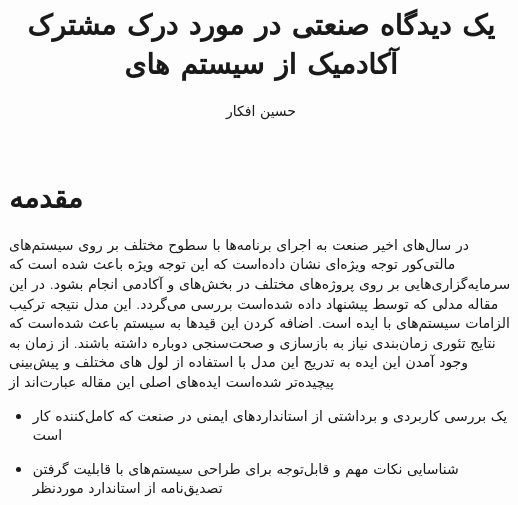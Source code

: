 \documentclass[a4paper, 12pt]{article}
\title{یک دیدگاه صنعتی در مورد درک مشترک آکادمیک از سیستم های \lr{mixed-criticality}}
\author{حسین افکار}
\begin{document}
\maketitle

\section{مقدمه}
در سال‌های اخیر صنعت به اجرای برنامه‌ها با سطوح
مختلف بر روی سیستم‌های مالتی‌کور توجه ویژه‌ای نشان داده‌است که این توجه ویژه باعث
شده است که سرمایه‌گزاری‌هایی بر روی پروژه‌های مختلف در بخش‌های
و
آکادمی انجام بشود.
در این مقاله مدلی که توسط
پیشنهاد داده شده‌است بررسی می‌گردد. این مدل نتیجه ترکیب الزامات سیستم‌های
با ایده
است.
اضافه کردن این قید‌ها به سیستم باعث شده‌است که نتایج تئوری زمان‌بندی نیاز به بازسازی و صحت‌سنجی
دوباره داشته باشند.
از زمان به وجود آمدن این ایده به تدریج این مدل با استفاده از لول های مختلف
و پیش‌بینی
پیچیده‌تر شده‌است
ایده‌های اصلی این مقاله عبارت‌اند از
\begin{itemize}
    \item یک بررسی کاربردی و برداشتی از استاندارد‌های ایمنی در صنعت که کامل‌کننده کار 
    است
    \item شناسایی نکات مهم و قابل‌توجه برای طراحی سیستم‌های 
    با قابلیت گرفتن تصدیق‌نامه از استاندارد مورد‌نظر
\end{itemize}
\end{document}
